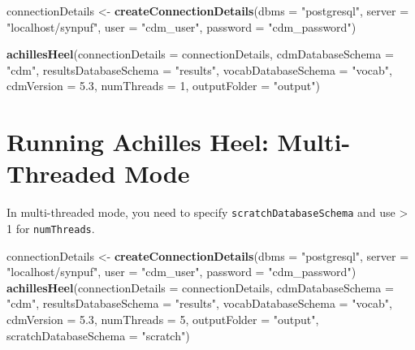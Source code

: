 \documentclass[]{article}
\newenvironment{Shaded}{\begin{snugshade}}{\end{snugshade}}
\newcommand{\KeywordTok}[1]{\textcolor[rgb]{0.13,0.29,0.53}{\textbf{#1}}}
\newcommand{\DataTypeTok}[1]{\textcolor[rgb]{0.13,0.29,0.53}{#1}}
\newcommand{\DecValTok}[1]{\textcolor[rgb]{0.00,0.00,0.81}{#1}}
\newcommand{\FloatTok}[1]{\textcolor[rgb]{0.00,0.00,0.81}{#1}}
\newcommand{\StringTok}[1]{\textcolor[rgb]{0.31,0.60,0.02}{#1}}
\newcommand{\NormalTok}[1]{#1}
\begin{document}
\begin{Shaded}
\begin{Highlighting}[]
\NormalTok{connectionDetails <-}\StringTok{ }\KeywordTok{createConnectionDetails}\NormalTok{(}\DataTypeTok{dbms =} \StringTok{"postgresql"}\NormalTok{, }
                                             \DataTypeTok{server =} \StringTok{"localhost/synpuf"}\NormalTok{, }
                                             \DataTypeTok{user =} \StringTok{"cdm_user"}\NormalTok{, }
                                             \DataTypeTok{password =} \StringTok{"cdm_password"}\NormalTok{)}

\KeywordTok{achillesHeel}\NormalTok{(}\DataTypeTok{connectionDetails =}\NormalTok{ connectionDetails, }
             \DataTypeTok{cdmDatabaseSchema =} \StringTok{"cdm"}\NormalTok{, }
             \DataTypeTok{resultsDatabaseSchema =} \StringTok{"results"}\NormalTok{, }
             \DataTypeTok{vocabDatabaseSchema =} \StringTok{"vocab"}\NormalTok{, }
             \DataTypeTok{cdmVersion =} \FloatTok{5.3}\NormalTok{, }
             \DataTypeTok{numThreads =} \DecValTok{1}\NormalTok{, }
             \DataTypeTok{outputFolder =} \StringTok{"output"}\NormalTok{)}
\end{Highlighting}
\end{Shaded}

\section{Running Achilles Heel: Multi-Threaded
Mode}\label{running-achilles-heel-multi-threaded-mode}

In multi-threaded mode, you need to specify
\texttt{scratchDatabaseSchema} and use \textgreater{} 1 for
\texttt{numThreads}.

\begin{Shaded}
\begin{Highlighting}[]
\NormalTok{connectionDetails <-}\StringTok{ }\KeywordTok{createConnectionDetails}\NormalTok{(}\DataTypeTok{dbms =} \StringTok{"postgresql"}\NormalTok{, }
                                             \DataTypeTok{server =} \StringTok{"localhost/synpuf"}\NormalTok{, }
                                             \DataTypeTok{user =} \StringTok{"cdm_user"}\NormalTok{, }
                                             \DataTypeTok{password =} \StringTok{"cdm_password"}\NormalTok{)}
\KeywordTok{achillesHeel}\NormalTok{(}\DataTypeTok{connectionDetails =}\NormalTok{ connectionDetails, }
             \DataTypeTok{cdmDatabaseSchema =} \StringTok{"cdm"}\NormalTok{, }
             \DataTypeTok{resultsDatabaseSchema =} \StringTok{"results"}\NormalTok{, }
             \DataTypeTok{vocabDatabaseSchema =} \StringTok{"vocab"}\NormalTok{, }
             \DataTypeTok{cdmVersion =} \FloatTok{5.3}\NormalTok{, }
             \DataTypeTok{numThreads =} \DecValTok{5}\NormalTok{, }
             \DataTypeTok{outputFolder =} \StringTok{"output"}\NormalTok{, }
             \DataTypeTok{scratchDatabaseSchema =} \StringTok{"scratch"}\NormalTok{)}
\end{Highlighting}
\end{Shaded}
\end{document}
